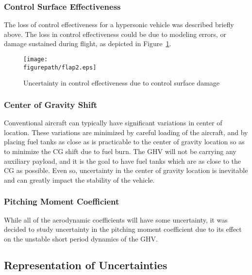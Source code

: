 \subsubsection*{Control Surface Effectiveness}

The loss of control effectiveness for a hypersonic vehicle was described briefly above.
The loss in control effectiveness could be due to modeling errors, or damage sustained during flight, as depicted in Figure~\ref{fig:flapdamage}.

\begin{figure}[H]
  \begin{center}
    \texttt{[image: \\figurepath/flap2.eps]}
    \caption{Uncertainty in control effectiveness due to control surface damage\label{fig:flapdamage}}
  \end{center}
\end{figure}

\subsubsection*{Center of Gravity Shift}

Conventional aircraft can typically have significant variations in center of location.
These variations are minimized by careful loading of the aircraft, and by placing fuel tanks as close as is practicable to the center of gravity location so as to minimize the CG shift due to fuel burn.
The GHV will not be carrying any auxiliary payload, and it is the goal to have fuel tanks which are as close to the CG as possible.
Even so, uncertainty in the center of gravity location is inevitable and can greatly impact the stability of the vehicle.

\subsubsection*{Pitching Moment Coefficient}

While all of the aerodynamic coefficients will have some uncertainty, it was decided to study uncertainty in the pitching moment coefficient due to its effect on the unstable short period dynamics of the GHV.\@

\subsection{Representation of Uncertainties}\label{sec:repofuncertainties}

